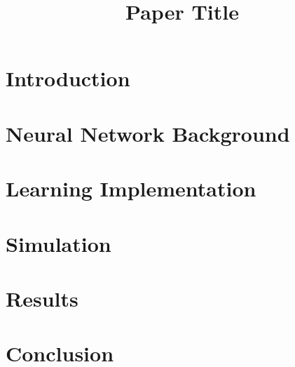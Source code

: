 \documentclass[a4paper,12pt]{article}
\title{Paper Title}
\begin{document}
\maketitle



\section{Introduction}



\section{Neural Network Background}



\section{Learning Implementation}



\section{Simulation}



\section{Results}



\section{Conclusion}



\nocite{wirefit,qlearn,backprop,practical,tutorial,kinematics}

\pagebreak


\end{document}
